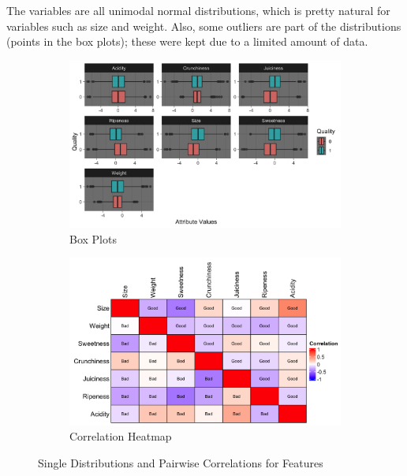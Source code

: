 \documentclass[
]{report}
\begin{document}
The variables are all unimodal normal distributions, which is pretty
natural for variables such as size and weight. Also, some outliers are
part of the distributions (points in the box plots); these were kept due
to a limited amount of data.

\begin{figure}[h]
    \begin{subfigure}{0.45\textwidth} %
        \centering
        \includegraphics[width=\textwidth]{images/BP1.png}
        \caption{Box Plots}
        \label{fig:scree_plot}
    \end{subfigure}
    \hfill %
    \begin{subfigure}{0.45\textwidth} %
        \centering
        \includegraphics[width=\textwidth]{images/HM1.png}
        \caption{Correlation Heatmap}
        \label{fig:pca_result}
    \end{subfigure}
    \caption{Single Distributions and Pairwise Correlations for Features}
    \label{fig:pca_combined}
\end{figure}
\end{document}
